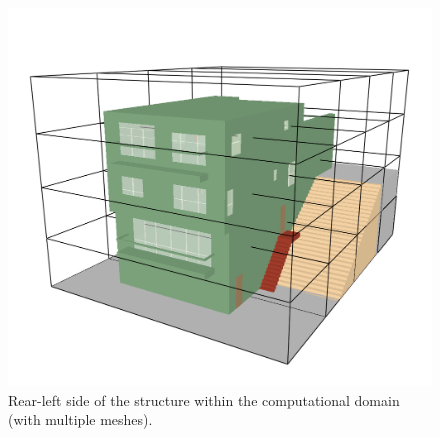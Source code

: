 \documentclass[12pt,oneside]{book}
\begin{document}
\begin{figure}[!ht]
\includegraphics[width=6.5in]{../Figures/SMV_Exterior_Meshes}
\caption[Rear-left side of the structure within the computational domain.]
{Rear-left side of the structure within the computational domain (with multiple meshes).}
\label{fig:mult_mesh}
\end{figure}
\end{document}
